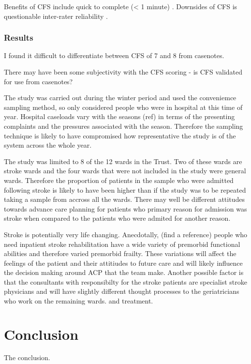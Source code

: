 \documentclass
[
	12pt,
	a4paper,
	oneside,
]{report}
\begin{document}
Benefits of CFS include quick to complete (< 1 minute) \parencite{elliott:17}.
Downsides of CFS is questionable inter-rater reliability
\parencite{gilbert:18}.

\subsection{Results}

I found it difficult to differentiate between CFS of 7 and 8 from casenotes.

There may have been some subjectivity with the CFS scoring - is CFS validated 
for use from casenotes?

The study was carried out during the winter period and used the conveniemce
sampling method, so only considered people who were in hospital at this time 
of year. Hospital caseloads vary with the seasons (ref) in terms of the 
presenting complaints and the pressures associated with the season. Therefore
the sampling technique is likely to have compromised how representative the
study is of the system across the whole year.

The study was limited to 8 of the 12 wards in the Trust. Two of these wards
are stroke wards and the four wards that were not included in the study were 
general wards. Therefore the proportion of patients in the sample
who were admitted following stroke is likely to have been higher than if the 
study was to be repeated taking a sample from accross all the wards. There may 
well be different attitudes towards advance care planning for patients who 
primary reason for admission was stroke when compared to the patients who
were admited for another reason.

Stroke is potentially very life changing. Anecdotally, (find a reference) 
people who need
inpatient stroke rehabilitation have a wide variety of premorbid functional 
abilities and therefore varied premorbid frailty. These variations will
affect the feelings of the patient and their attitiudes to future care and will
likely influence the decision making around ACP that the team make. Another
possible factor is that the consultants with responsibilty for the stroke 
patients are specialist stroke physicians and will have slightly different 
thought processes to the geriatricians who work on the remaining wards.
and treatment.

\chapter{Conclusion}
The conclusion.
\end{document}
